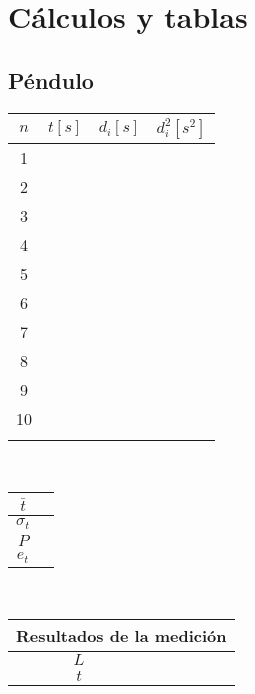\documentclass[letter,twoside,11pt]{article}
\begin{document}
\section{Cálculos y tablas}

\subsection{Péndulo}
\begin{tabular}{|c|>{\centering}m{2.0cm}<{\centering}
                  |>{\centering}m{2.0cm}<{\centering}
                  |>{\centering}m{2.0cm}<{\centering}|}
\hline
\textbf{$n$} & \textbf{$t[s]$}
             & \textbf{$d_i[s]$}
             & \textbf{$d_i^2[s^2]$} \tabularnewline \hline
1 & & & \\ \hline
2 & & & \\ \hline
3 & & & \\ \hline
4 & & & \\ \hline
5 & & & \\ \hline
6 & & & \\ \hline
7 & & & \\ \hline
8 & & & \\ \hline
9 & & & \\ \hline
10 & & & \\ \hline
 & & & \\ \hline
\end{tabular}\\

\vspace{1.4cm}
\begin{tabular}{|c|p{2.0cm}|}
\hline
$\bar{t}$ & \\ \hline
$\sigma_t$ & \\ \hline
$P$ & \\ \hline
$e_t$ & \\ \hline
\end{tabular}\\

\vspace{1.4cm}
\begin{tabular}{|c|p{2.0cm}|}
\hline
\multicolumn{2}{|c|}{Resultados de la medición} \\ \hline
$L$ & \\ \hline
$t$ & \\ \hline
\end{tabular}
\end{document}
